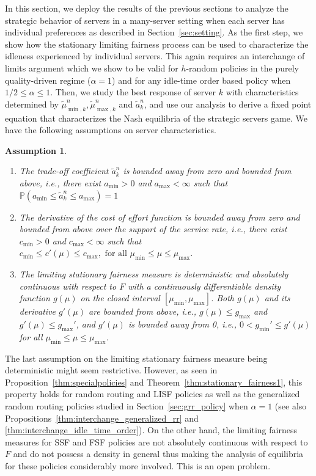 \documentclass[a4paper,11pt,twoside]{article}
\numberwithin{equation}{section}
\numberwithin{figure}{section}
\theoremstyle{plain}
\newtheorem{assumption}[theorem]{Assumption}
\newcommand{\PP}{\mathbb{P}}
\newcommand{\1}{\mathbbm{1}}
\begin{document}
In this section, we deploy the results of the previous sections to analyze the strategic behavior of servers in a many-server setting when each server has individual preferences as described in Section~\ref{sec:setting}. As the first step, we show how the stationary limiting fairness process can be used to characterize the idleness experienced by individual servers. This again requires an interchange of limits argument which we show to be valid for $h$-random policies in the purely quality-driven regime ($\alpha=1$) and for any idle-time order based policy when $1/2\leq \alpha\leq 1$. Then, we study the best response of server $k$ with characteristics determined by $\tilde{\mu}_{\min,k}^n, \tilde{\mu}_{\max,k}^n$ and $\tilde{a}_k^n$, and use our analysis to derive a fixed point equation that characterizes the Nash equilibria of the strategic servers game. 
We have the following assumptions on server characteristics. 
\begin{assumption}\label{asm:utility_assumptions}
\begin{enumerate}
    \item The trade-off coefficient $\tilde{a}_k^n$ is bounded away from zero and bounded from above, i.e., there exist $a_{\min}>0$ and $a_{\max}<\infty$ such that $\PP(a_{\min}\leq \tilde{a}_k^n\leq a_{\max})=1$
    \item  The derivative of the cost of effort function is bounded away from zero and bounded from above over the support of the service rate, i.e., there exist $c_{\min}>0$ and $c_{\max}<\infty$ such that $c_{\min}\leq c'(\mu) \leq c_{\max}, \mbox{ for all }\mu_{\min}\leq \mu \leq \mu_{\max}.$
    \item The limiting stationary fairness measure is deterministic and absolutely continuous with respect to $F$ with  a continuously differentiable density function $g(\mu)$ on the closed interval $[\mu_{\min}, \mu_{\max}]$. Both $g(\mu)$ and its derivative $g'(\mu)$ are bounded from above, i.e., $g(\mu)\leq g_{\max}$ and $g'(\mu)\leq g_{\max}'$, and $g'(\mu)$ is bounded away from 0, i.e., $0<g_{\min}'\leq g'(\mu)$ for all $\mu_{\min}\leq \mu \leq \mu_{\max}$.
\end{enumerate}
\end{assumption}

 The last assumption on the limiting stationary fairness measure being deterministic might seem restrictive. 
However, as seen in Proposition~\ref{thm:specialpolicies} and Theorem~\ref{thm:stationary_fairness1}, this property holds for random routing and LISF policies as well as the generalized random routing policies studied in Section~\ref{sec:grr_policy} when $\alpha=1$ (see also Propositions~\ref{thm:interchange_generalized_rr} and \ref{thm:interchange_idle_time_order}). 
On the other hand, the limiting fairness measures for SSF and FSF policies are not absolutely continuous with respect to $F$ and do not possess a density in general thus making the analysis of equilibria for these policies considerably more involved. This is an open problem.
\end{document}
